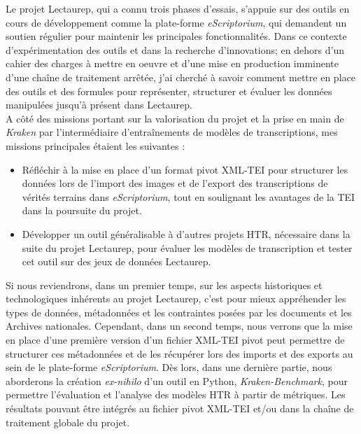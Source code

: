 Le projet Lectaurep, qui a connu trois phases d'essais, s'appuie sur des outils en cours de développement comme la plate-forme \textit{eScriptorium}, qui demandent un soutien régulier pour maintenir les principales fonctionnalités. Dans ce contexte d'expérimentation des outils et dans la recherche d'innovations; en dehors d'un cahier des charges à mettre en oeuvre et d'une mise en production imminente d'une chaîne de traitement arrêtée, j'ai cherché à savoir comment mettre en place des outils et des formules pour représenter, structurer et évaluer les données manipulées jusqu'à présent dans Lectaurep.\\ 

A côté des missions portant sur la valorisation du projet et la prise en main de \textit{Kraken} par l'intermédiaire d'entraînements de modèles de transcriptions, mes missions principales étaient les suivantes : 
\begin{itemize}
    \item Réfléchir à la mise en place d'un format pivot XML-TEI pour structurer les données lors de l'import des images et de l'export des transcriptions de vérités terrains dans \textit{eScriptorium}, tout en soulignant les avantages de la TEI dans la poursuite du projet.
    \item Développer un outil généralisable à d'autres projets HTR, nécessaire dans la suite du projet Lectaurep, pour évaluer les modèles de transcription et tester cet outil sur des jeux de données Lectaurep. 
\end{itemize}

Si nous reviendrons, dans un premier temps, sur les aspects historiques et technologiques inhérents au projet Lectaurep, c'est pour mieux appréhender les types de données, métadonnées et les contraintes posées par les documents et les Archives nationales. Cependant, dans un second temps, nous verrons que la mise en place d'une première version d'un fichier XML-TEI pivot peut permettre de structurer ces métadonnées et de les récupérer lors des imports et des exports au sein de le plate-forme \textit{eScriptorium}. Dès lors, dans une dernière partie, nous aborderons la création \textit{ex-nihilo} d'un outil en Python, \textit{Kraken-Benchmark}, pour permettre l'évaluation et l'analyse des modèles HTR à partir de métriques. Les résultats pouvant être intégrés au fichier pivot XML-TEI et/ou dans la chaîne de traitement globale du projet.

\newpage
\thispagestyle{empty}
